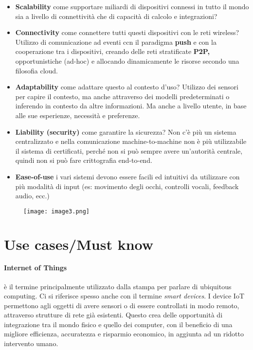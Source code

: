 \begin{itemize}
\item \textbf{Scalability} come supportare miliardi di dispositivi connessi
  in tutto il mondo sia a livello di connettività che di
  capacità di calcolo e integrazioni?

\item \textbf{Connectivity} come connettere tutti questi dispositivi con le
  reti wireless? Utilizzo di comunicazione ad eventi ccn il paradigma
  \textbf{push} e con la cooperazione tra i dispositivi, creando delle
  reti stratificate \textbf{P2P,} opportunistiche (ad-hoc) e allocando
  dinamicamente le risorse secondo una filosofia cloud.

\item \textbf{Adaptability} come adattare questo al contesto d'uso? Utilizzo
  dei sensori per capire il contesto, ma anche attraverso dei modelli
  predeterminati o inferendo in contesto da altre informazioni. Ma anche
  a livello utente, in base alle sue esperienze, necessità e preferenze.

\item \textbf{Liability (security)} come garantire la sicurezza? Non c'è più
  un sistema centralizzato e nella comunicazione machine-to-machine non
  è più utilizzabile il sistema di certificati, perché non si può sempre
  avere un'autorità centrale, quindi non si può fare crittografia
  end-to-end.

\item \textbf{Ease-of-use} i vari sistemi devono essere facili ed intuitivi
  da utilizzare con più modalità di input (es: movimento degli occhi,
  controlli vocali, feedback audio, ecc.)

\end{itemize}

\begin{figure}[H]
 \centering
 \texttt{[image: image3.png]}
\end{figure}

\section{Use cases/Must know}
\label{use-casesmust-know}

\paragraph*{Internet of Things} è il termine principalmente utilizzato dalla
stampa per parlare di ubiquitous computing. Ci si riferisce spesso anche con il 
termine \textit{smart devices}. I device IoT permettono agli oggetti di avere 
sensori o di essere controllati in modo remoto, attraverso strutture di rete 
già esistenti. Questo crea delle opportunità di integrazione tra il mondo 
fisico e quello dei computer, con il beneficio di una migliore efficienza, 
accuratezza e risparmio economico, in aggiunta ad un ridotto intervento umano.

